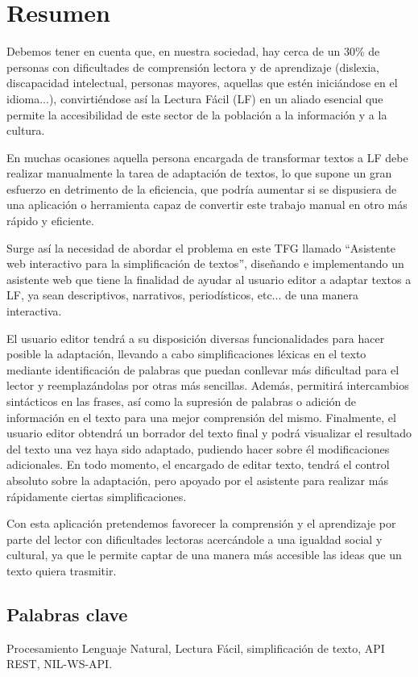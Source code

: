 \chapter*{Resumen}

Debemos tener en cuenta que, en nuestra sociedad, hay cerca de un 30\% de personas con dificultades de comprensión lectora y de aprendizaje (dislexia, discapacidad intelectual, personas mayores, aquellas que estén iniciándose en el idioma...), convirtiéndose así la Lectura Fácil (LF) en un aliado esencial que permite la accesibilidad de este sector de la población a la información y a la cultura. 

 \setlength{\parskip}{10pt}

En muchas ocasiones aquella persona encargada de transformar textos a LF debe realizar manualmente la tarea de adaptación de textos, lo que supone un gran esfuerzo en detrimento de la eficiencia, que podría aumentar si se dispusiera de una aplicación o herramienta capaz de convertir este trabajo manual en otro más rápido y eficiente.

 \setlength{\parskip}{10pt}

Surge así la necesidad de abordar el problema en este TFG llamado ``Asistente web interactivo para la simplificación de textos'', diseñando e implementando un asistente web que tiene la finalidad de ayudar al usuario editor a adaptar textos a LF, ya sean descriptivos, narrativos, periodísticos, etc... de una manera interactiva. 

 \setlength{\parskip}{10pt}

El usuario editor tendrá a su disposición diversas funcionalidades para hacer posible la adaptación, llevando a cabo simplificaciones léxicas en el texto mediante identificación de palabras que puedan conllevar más dificultad para el lector y reemplazándolas por otras más sencillas. Además, permitirá intercambios sintácticos en las frases, así como la supresión de palabras o adición de información en el texto para una mejor comprensión del mismo. Finalmente, el usuario editor obtendrá un borrador del texto final y podrá visualizar el resultado del texto una vez haya sido adaptado, pudiendo hacer sobre él modificaciones adicionales. En todo momento, el encargado de editar texto, tendrá el control absoluto sobre la adaptación, pero apoyado por el asistente para realizar más rápidamente ciertas simplificaciones.

 \setlength{\parskip}{10pt}

Con esta aplicación pretendemos favorecer la comprensión y el aprendizaje por parte del lector con dificultades lectoras acercándole a una igualdad social y cultural, ya que le permite captar de una manera más accesible las ideas que un texto quiera trasmitir.



\section*{Palabras clave}
   
\noindent Procesamiento Lenguaje Natural, Lectura Fácil, simplificación de texto, API REST, NIL-WS-API.

   



